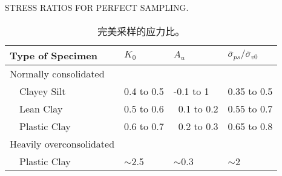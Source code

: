 \begin{table*}[!htb]
    \centering
    \caption{STRESS RATIOS FOR PERFECT SAMPLING.}
    \addtocounter{table}{-1}
    \vspace{-8pt}
    \renewcommand{\tablename}{表}
    \caption{完美采样的应力比。}
    \vspace{4pt}
    \renewcommand{\tablename}{Table}
    \begin{tabularx}{\textwidth}{XXXX}
        \toprule
        Type of Specimen & $K_0$ & $A_u$ & $\overline{\sigma}_{ps}/\overline{\sigma}_{v0}$ \\
        \midrule
        Normally consolidated & & & \\
        ~~Clayey Silt & 0.4 to 0.5 & -0.1 to 1 & 0.35 to 0.5 \\
        ~~Lean Clay & 0.5 to 0.6 & ~0.1 to 0.2 & 0.55 to 0.7 \\
        ~~Plastic Clay & 0.6 to 0.7 & ~0.2 to 0.3 & 0.65 to 0.8 \\
        Heavily overconsolidated & & & \\
        ~~Plastic Clay & $\sim$2.5 & $\sim$0.3 & $\sim$2 \\
        \bottomrule
    \end{tabularx}%
    \label{table:1}%
\end{table*}
